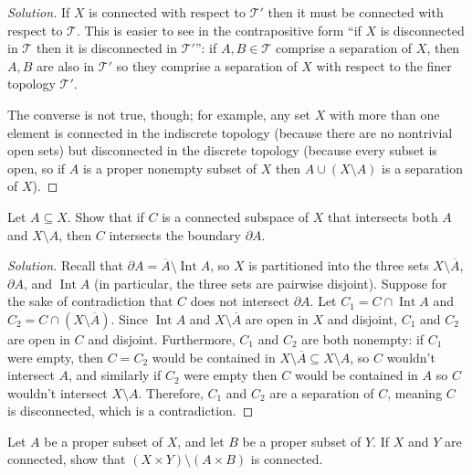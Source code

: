 \documentclass[10pt]{article}
\providecommand{\ol}{\overline}
\newenvironment{soln}{\begin{proof}[Solution]}{\end{proof}}
\begin{document}
\begin{soln}
    If $X$ is connected with respect to $\mathcal T'$ then
    it must be connected with respect to $\mathcal T$.
    This is easier to see in the contrapositive form
    ``if $X$ is disconnected in $\mathcal T$ then
    it is disconnected in $\mathcal T'$'':
    if $A,B\in\mathcal T$ comprise a separation of $X$,
    then $A,B$ are also in $\mathcal T'$ so they comprise a separation of $X$
    with respect to the finer topology $\mathcal T'$.

    The converse is not true, though; for example, any set $X$
    with more than one element is connected in the indiscrete topology
    (because there are no nontrivial open sets)
    but disconnected in the discrete topology
    (because every subset is open, so if $A$ is a proper nonempty subset of $X$
    then $A\cup(X\setminus A)$ is a separation of $X$).
\end{soln}

\begin{problem}
    [Munkres 23.6]
    Let $A\subseteq X$. Show that if $C$ is a connected subspace of $X$
    that intersects both $A$ and $X\setminus A$,
    then $C$ intersects the boundary $\partial A$.
\end{problem}

\begin{soln}
    Recall that $\partial A = \ol A \setminus \operatorname{Int}A$,
    so $X$ is partitioned into the three sets
    $X\setminus\ol A$, $\partial A$, and $\operatorname{Int}A$
    (in particular, the three sets are pairwise disjoint).
    Suppose for the sake of contradiction that $C$ does not intersect $\partial A$.
    Let $C_1 = C\cap\operatorname{Int}A$ and $C_2 = C\cap(X\setminus\ol A)$.
    Since $\operatorname{Int}A$ and $X\setminus\ol A$ are open in $X$ and disjoint,
    $C_1$ and $C_2$ are open in $C$ and disjoint.
    Furthermore, $C_1$ and $C_2$ are both nonempty:
    if $C_1$ were empty, then $C = C_2$ would be contained in
    $X\setminus\ol A\subseteq X\setminus A$, so $C$ wouldn't intersect $A$,
    and similarly if $C_2$ were empty then $C$ would be contained in $A$
    so $C$ wouldn't intersect $X\setminus A$.
    Therefore, $C_1$ and $C_2$ are a separation of $C$,
    meaning $C$ is disconnected, which is a contradiction.
\end{soln}

\begin{problem}
    [Munkres 23.9]
    Let $A$ be a proper subset of $X$, and let $B$ be a proper subset of $Y$.
    If $X$ and $Y$ are connected, show that $(X\times Y)\setminus(A\times B)$
    is connected.
\end{problem}
\end{document}
